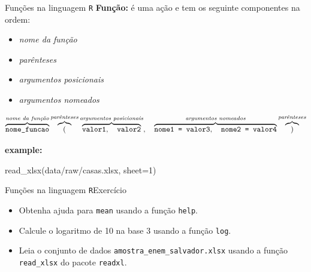 \documentclass[
  10pt,
  ignorenonframetext,
]{beamer}
\newenvironment{Shaded}{\begin{snugshade}}{\end{snugshade}}
\newcommand{\AttributeTok}[1]{\textcolor[rgb]{0.40,0.45,0.13}{#1}}
\newcommand{\DecValTok}[1]{\textcolor[rgb]{0.68,0.00,0.00}{#1}}
\newcommand{\FunctionTok}[1]{\textcolor[rgb]{0.28,0.35,0.67}{#1}}
\newcommand{\NormalTok}[1]{\textcolor[rgb]{0.00,0.23,0.31}{#1}}
\newcommand{\StringTok}[1]{\textcolor[rgb]{0.13,0.47,0.30}{#1}}
\providecommand{\tightlist}{%
  \setlength{\itemsep}{0pt}\setlength{\parskip}{0pt}}\usepackage{longtable,booktabs,array}
\begin{document}
\begin{frame}[fragile]{Funções na linguagem \texttt{R}}
\protect\hypertarget{funuxe7uxf5es-na-linguagem-r}{}
\textbf{Função:} é uma ação e tem os seguinte componentes na ordem:

\begin{itemize}
\tightlist
\item
  \emph{nome da função}
\item
  \emph{parênteses}
\item
  \emph{argumentos posicionais}
\item
  \emph{argumentos nomeados}
\end{itemize}

\footnotesize

\[
\overbrace{\texttt{nome\_funcao}}^{\text{\textit{nome da função}}} \overbrace{(}^{\text{\textit{parênteses}}} \overbrace{\texttt{valor1},\quad \texttt{valor2}}^{\text{\textit{argumentos posicionais}}},\quad \overbrace{\texttt{nome1 = valor3},\quad \texttt{nome2 = valor4}}^{\text{\textit{argumentos nomeados}}} \overbrace{)}^{\text{\textit{parênteses}}}
\]

\normalsize

\textbf{example:}

\begin{Shaded}
\begin{Highlighting}[]
\FunctionTok{read\_xlsx}\NormalTok{(}\StringTok{\textquotesingle{}data/raw/casas.xlsx\textquotesingle{}}\NormalTok{, }\AttributeTok{sheet=}\DecValTok{1}\NormalTok{)}
\end{Highlighting}
\end{Shaded}
\end{frame}

\begin{frame}[fragile]{Funções na linguagem
\texttt{R}\newline Exercício}
\protect\hypertarget{funuxe7uxf5es-na-linguagem-rexercuxedcio}{}
\begin{itemize}
\tightlist
\item
  Obtenha ajuda para \texttt{mean} usando a função \texttt{help}.
\item
  Calcule o logaritmo de 10 na base 3 usando a função \texttt{log}.
\item
  Leia o conjunto de dados \texttt{amostra\_enem\_salvador.xlsx} usando
  a função \texttt{read\_xlsx} do pacote \texttt{readxl}.
\end{itemize}
\end{frame}
\end{document}
